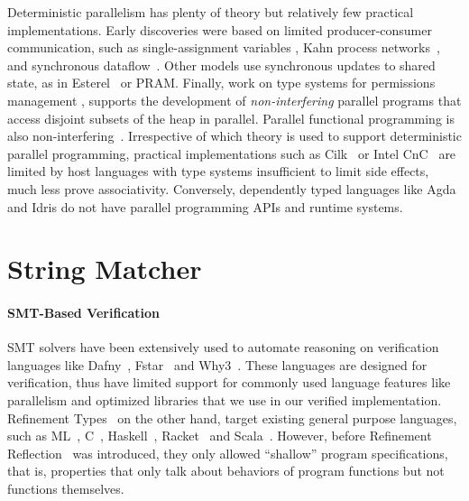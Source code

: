 %
Deterministic parallelism has plenty of theory but relatively few practical
implementations.  Early discoveries were based on limited producer-consumer
communication, such as single-assignment variables \cite{Tesler-1968,IStructures}, Kahn
process networks~\cite{kahn-1974}, and synchronous dataflow~\cite{lee-sdf}.
Other models use synchronous updates to shared state, as in
Esterel~\cite{synchronous-overview} or PRAM.  Finally, work on type systems for
permissions management \cite{permission-types,habanero-java-permissions},
supports the development of {\em non-interfering} parallel programs that access
disjoint subsets of the heap in parallel.  Parallel functional programming is
also non-interfering~\cite{manticore,multicore-ghc}.
%
Irrespective of which theory is used to support deterministic parallel
programming, practical implementations such as Cilk~\cite{cilk} or Intel
CnC~\cite{cnc} are limited by host languages with type systems insufficient to
limit side effects, much less prove associativity.  Conversely, dependently
typed languages like Agda and Idris do not have parallel programming APIs and
runtime systems.



\section{String Matcher}\label{sec:stringmatcher:related}


\paragraph{SMT-Based Verification}
%
SMT solvers have been extensively used to automate
reasoning on verification languages like
Dafny~\cite{dafny}, Fstar~\cite{fstar} and Why3~\cite{why3}.
%
These languages are designed for verification,
thus have limited support for commonly used language
features like parallelism and optimized libraries
that we use in our verified implementation.
%
Refinement Types~\cite{ConstableS87,FreemanPfenningDONTCITE91,Rushby98}
on the other hand, target existing general purpose languages,
such as
ML~\cite{pfenningxi98,GordonRefinement09,LiquidPLDI08},
C~\cite{deputy,LiquidPOPL10},
Haskell~\cite{Vazou14},
Racket~\cite{RefinedRacket}
and Scala~\cite{refinedscala}.
However, before Refinement Reflection~\cite{reflection} was introduced,
they only allowed ``shallow'' program specifications,
that is, properties that only talk about behaviors of program functions
but not functions themselves.
%

